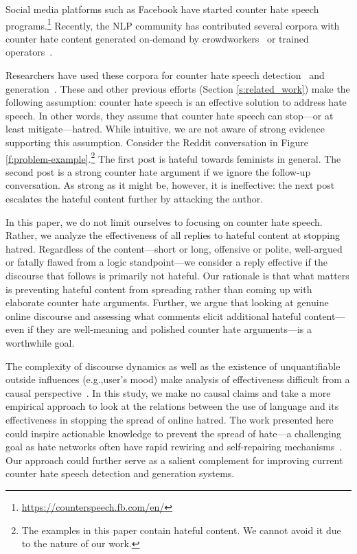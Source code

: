 \documentclass[11pt]{article}
\begin{document}
Social media platforms such as Facebook have started counter hate speech programs.\footnote{\url{https://counterspeech.fb.com/en/}} 
Recently, the NLP community has contributed several corpora with counter hate content
generated on-demand by crowdworkers~\cite{DBLP:conf/icwsm/MathewSTRSMG019,qian-etal-2019-benchmark} or trained operators~\cite{chung-etal-2019-conan}.

Researchers have used these corpora for counter hate speech detection~\cite{DBLP:conf/icwsm/MathewSTRSMG019} and generation~\cite{tekiroglu-etal-2020-generating,fanton-etal-2021-human,zhu-bhat-2021-generate}.
These and other previous efforts (Section \ref{s:related_work}) make the following assumption:
counter hate speech is an effective solution to address hate speech.
In other words, they assume that counter hate speech can stop---or at least mitigate---hatred.
While intuitive, we are not aware of strong evidence supporting this assumption.
Consider the Reddit conversation in Figure \ref{f:problem-example}.\footnote{The examples in this paper contain hateful content. We cannot avoid it due to the nature of our work.}
The first post is hateful towards feminists in general. 
The second post is a strong counter hate argument if we ignore the follow-up conversation.
As strong as it might be, however, it is ineffective: the next post escalates the hateful content further by attacking the author.

In this paper, we do not limit ourselves to focusing on counter hate speech.
Rather, we analyze the effectiveness of all replies to hateful content at stopping hatred.
Regardless of the content---short or long, offensive or polite, well-argued or fatally flawed from a logic standpoint---we consider a reply effective if the discourse that follows is primarily not hateful.
Our rationale is that what matters is preventing hateful content from spreading rather than coming up with elaborate counter hate arguments.
Further, we argue that looking at genuine online discourse and assessing what comments elicit additional hateful content---even if they are well-meaning and polished counter hate arguments---is a worthwhile goal.

The complexity of discourse dynamics as well as the existence of unquantifiable outside influences (e.g.,user's mood) make analysis of effectiveness difficult from a causal perspective~\cite{garland2022impact}. 
In this study, we make no causal claims and take a more empirical approach to look at the relations between the use of language and its effectiveness in stopping the spread of online hatred.
The work presented here could inspire actionable knowledge to prevent the spread of hate---a challenging goal as
hate networks often have rapid rewiring and self-repairing mechanisms~\cite{johnson2019hidden}.
Our approach could further serve as a salient complement for improving current counter hate speech detection and generation systems.
\end{document}
